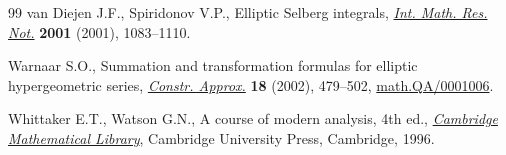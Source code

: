 \documentclass[pdftex]{sigma}
\numberwithin{equation}{section}
\begin{document}
\begin{thebibliography}{99}
van Diejen J.F., Spiridonov V.P., Elliptic {S}elberg integrals, \href{https://doi.org/10.1155/S1073792801000526}{\textit{Int.
 Math. Res. Not.}} \textbf{2001} (2001), 1083--1110.

Warnaar S.O., Summation and transformation formulas for elliptic hypergeometric
 series, \href{https://doi.org/10.1007/s00365-002-0501-6}{\textit{Constr. Approx.}} \textbf{18} (2002), 479--502,
 \href{http://arxiv.org/abs/math.QA/0001006}{math.QA/0001006}.

Whittaker E.T., Watson G.N., A course of modern analysis, 4th ed., \href{https://doi.org/10.1017/CBO9780511608759}{\textit{Cambridge
 Mathematical Library}}, Cambridge University Press, Cambridge, 1996.

\end{thebibliography}\LastPageEnding
\end{document}
